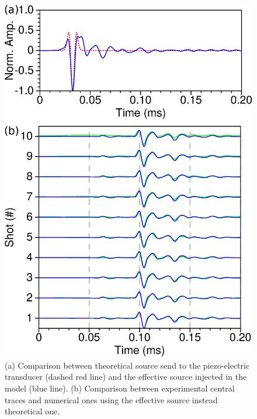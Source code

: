 \documentclass[manuscript,revised]{geophysics}
\begin{document}

\begin{figure}[!h]
	\centering
	\includegraphics[scale=0.5]{fig/spec_F50_CT_COMP.eps}
	\caption{(a) Comparison between theoretical source send to the piezo-electric transducer (dashed red line) and the effective source injected in the model (blue line). (b) Comparison between experimental central traces and numerical ones using the effective source instead theoretical one.}
	\label{panel_srcest_2d_mean_comp}
\end{figure}

\end{document}
